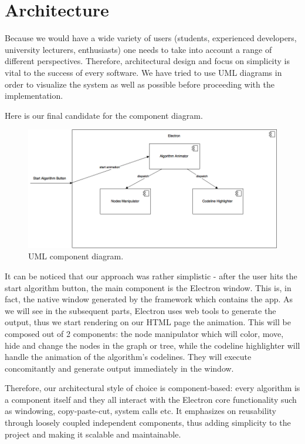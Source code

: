 \documentclass{l4proj}
\begin{document}
\section{Architecture}

Because we would have a wide variety of users (students, experienced developers, university lecturers, enthusiasts) one
needs to take into account a range of different perspectives. Therefore, architectural design and focus on simplicity is vital to the success of every software. We have tried to use UML
diagrams in order to visualize the system as well as possible before proceeding with the implementation.

Here is our final candidate for the component diagram.

\begin{figure}[!ht]
    \centering
    \includegraphics[scale=0.5]{UML_component_diagram}
    \caption{UML component diagram.}
    \label{fig:uml-component-diagram}
\end{figure}

It can be noticed that our approach was rather simplistic - after the user hits the start algorithm button, the main
component is the Electron window. This is, in fact, the native window generated by the framework which contains the
app. As we will see in the subsequent parts, Electron uses web tools to generate the output, thus we start rendering on
our HTML page the animation. This will be composed out of 2 components: the node manipulator which will color, move,
hide and change the nodes in the graph or tree, while the codeline highlighter will handle the animation of the
algorithm's codelines. They will execute concomitantly and generate output immediately in the window.

Therefore, our architectural style of choice is component-based: every algorithm is a component itself and they all
interact with the Electron core functionality such as windowing, copy-paste-cut, system calls etc. It emphasizes on
reusability through loosely coupled independent components, thus adding simplicity to the project and making it
scalable and maintainable.
\end{document}

